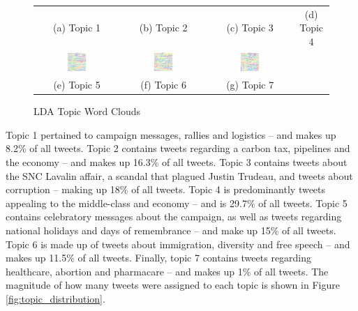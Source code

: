 \begin{figure}[h!]
\begin{tabular}{cccc}
    (a) Topic 1 & (b) Topic 2 & (c) Topic 3 & (d) Topic 4 \\[6pt]
    \includegraphics[width=0.25\textwidth]{Figures/topic_5_wordcloud} &
    \includegraphics[width=0.25\textwidth]{Figures/topic_6_wordcloud} &
    \includegraphics[width=0.25\textwidth]{Figures/topic_7_wordcloud} \\
    (e) Topic 5 & (f) Topic 6 & (g) Topic 7 \\[6pt]
    \end{tabular}
    \caption[LDA Topic Word Clouds]{LDA Topic Word Clouds}
    \label{fig:topic_word_clouds}
\end{figure}

Topic 1 pertained to campaign messages, rallies and logistics – and makes up
8.2\% of all tweets. Topic 2 contains tweets regarding a carbon tax, pipelines
and the economy – and makes up 16.3\% of all tweets. Topic 3 contains tweets
about the SNC Lavalin affair, a scandal that plagued Justin Trudeau, and tweets
about corruption – making up 18\% of all tweets. Topic 4 is predominantly tweets
appealing to the middle-class and economy – and is 29.7\% of all tweets. Topic 5
contains celebratory messages about the campaign, as well as tweets regarding
national holidays and days of remembrance – and make up 15\% of all tweets.
Topic 6 is made up of tweets about immigration, diversity and free speech – and
makes up 11.5\% of all tweets. Finally, topic 7 contains tweets regarding
healthcare, abortion and pharmacare – and makes up 1\% of all tweets. The
magnitude of how many tweets were assigned to each topic is shown in Figure
\ref{fig:topic_distribution}.

